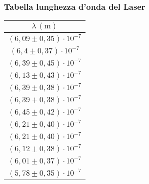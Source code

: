\subsubsection{Tabella lunghezza d'onda del Laser}
    \begin{table}[H]
    \centering
        \begin{tabular}{|c|}
        \hline
        $ \lambda \, (\text{m}) $ \\
        \hline
        $(6,09 \pm 0,35) \cdot 10^{-7}$ \\
        \hline
        $(6,4 \pm 0,37) \cdot 10^{-7}$ \\
        \hline
        $(6,39 \pm 0,45) \cdot 10^{-7}$ \\
        \hline
        $(6,13 \pm 0,43) \cdot 10^{-7}$ \\
        \hline
        $(6,39 \pm 0,38) \cdot 10^{-7}$ \\
        \hline
        $(6,39 \pm 0,38) \cdot 10^{-7}$ \\
        \hline
        $(6,45 \pm 0,42) \cdot 10^{-7}$ \\
        \hline
        $(6,21 \pm 0,40) \cdot 10^{-7}$ \\
        \hline
        $(6,21 \pm 0,40) \cdot 10^{-7}$ \\
        \hline
        $(6,12 \pm 0,38) \cdot 10^{-7}$ \\
        \hline
        $(6,01 \pm 0,37) \cdot 10^{-7}$ \\
        \hline
        $(5,78 \pm 0,35) \cdot 10^{-7}$ \\
        \hline
        \end{tabular}
    \end{table}

